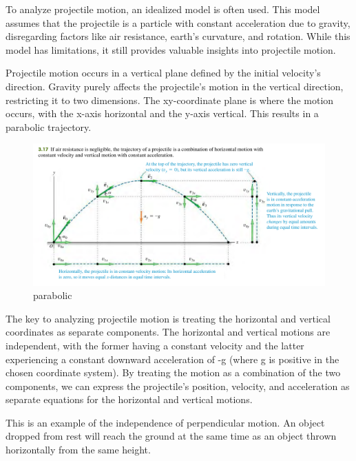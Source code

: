 \documentclass[11pt]{article}
\begin{document}
To analyze projectile motion, an idealized model is often used. This
model assumes that the projectile is a particle with constant
acceleration due to gravity, disregarding factors like air resistance,
earth's curvature, and rotation. While this model has limitations, it
still provides valuable insights into projectile motion.

Projectile motion occurs in a vertical plane defined by the initial
velocity's direction. Gravity purely affects the projectile's motion in
the vertical direction, restricting it to two dimensions. The
xy-coordinate plane is where the motion occurs, with the x-axis
horizontal and the y-axis vertical. This results in a parabolic
trajectory.

\begin{figure}
\centering
\includegraphics{images/parabolic_path.png}
\caption{parabolic}
\end{figure}

The key to analyzing projectile motion is treating the horizontal and
vertical coordinates as separate components. The horizontal and vertical
motions are independent, with the former having a constant velocity and
the latter experiencing a constant downward acceleration of -g (where g
is positive in the chosen coordinate system). By treating the motion as
a combination of the two components, we can express the projectile's
position, velocity, and acceleration as separate equations for the
horizontal and vertical motions.

This is an example of the independence of perpendicular motion. An
object dropped from rest will reach the ground at the same time as an
object thrown horizontally from the same height.
\end{document}
